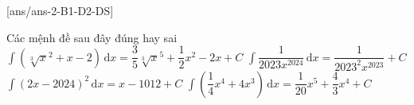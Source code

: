 \TNTF
{}[ans/ans-2-B1-D2-DS]
\begin{ex}%
	Các mệnh đề sau đây đúng hay sai
	\choiceTF
	{\True $\displaystyle\int{(\sqrt[3]x^2+x-2)\mathrm{\,d}x}=\dfrac{3}{5}\sqrt[3]x^5+\dfrac{1}{2}x^2-2x+C$}
	{\True $\displaystyle\int{\dfrac{1}{2023x^{2024}}\mathrm{\,d}x}=\dfrac{1}{2023^2x^{2023}}+C$}
	{$\displaystyle\int{(2x-2024)^2\mathrm{\,d}x}=x-1012+C$}
	{\True $\displaystyle\int{\left(\dfrac{1}{4}x^4+4x^3\right)\mathrm{\,d}x}=\dfrac{1}{20}x^5+\dfrac{4}{3}x^4+C$}
\end{ex}
